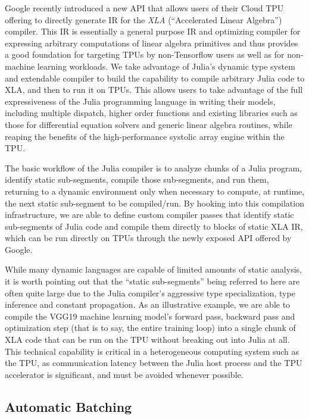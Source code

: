 \documentclass{juliacon}
\begin{document}
Google recently introduced a new API that allows users of their Cloud TPU offering to directly generate IR for the \textit{XLA} (``Accelerated Linear Algebra'') compiler. This IR is essentially a general purpose IR and optimizing compiler for expressing arbitrary computations of linear algebra primitives and thus provides a good foundation for targeting TPUs by non-Tensorflow users as well as for non-machine learning workloads.
We take advantage of Julia's dynamic type system and extendable compiler to build the capability to compile arbitrary Julia code to XLA, and then to run it on TPUs.
This allows users to take advantage of the full expressiveness of the Julia programming language in writing their models, including multiple dispatch, higher order functions and existing libraries such as those for differential equation solvers and generic linear algebra routines, while reaping the benefits of the high-performance systolic array engine within the TPU.

The basic workflow of the Julia compiler is to analyze chunks of a Julia program, identify static sub-segments, compile those sub-segments, and run them, returning to a dynamic environment only when necessary to compute, at runtime, the next static sub-segment to be compiled/run.
By hooking into this compilation infrastructure, we are able to define custom compiler passes that identify static sub-segments of Julia code and compile them directly to blocks of static XLA IR, which can be run directly on TPUs through the newly exposed API offered by Google.

While many dynamic languages are capable of limited amounts of static analysis, it is worth pointing out that the ``static sub-segments'' being referred to here are often quite large due to the Julia compiler's aggressive type specialization, type inference and constant propagation.
As an illustrative example, we are able to compile the VGG19 \cite{vgg19} machine learning model's forward pass, backward pass and optimization step (that is to say, the entire training loop) into a single chunk of XLA code that can be run on the TPU without breaking out into Julia at all.
This technical capability is critical in a heterogeneous computing system such as the TPU, as communication latency between the Julia host process and the TPU accelerator is significant, and must be avoided whenever possible.

\subsection{Automatic Batching}
\label{spmd}
\end{document}
